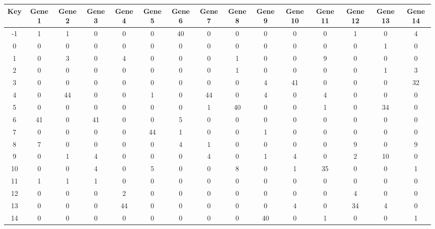 \begin{tabular}{|c|c|c|c|c|c|c|c|c|c|c|c|c|c|c|}
\hline
Key & Gene 1 & Gene 2 & Gene 3 & Gene 4 & Gene 5 & Gene 6 & Gene 7 & Gene 8 & Gene 9 & Gene 10 & Gene 11 & Gene 12 & Gene 13 & Gene 14 \\
\hline
-1 & 1 & 1 & 0 & 0 & 0 & 40 & 0 & 0 & 0 & 0 & 0 & 1 & 0 & 4 \\
0 & 0 & 0 & 0 & 0 & 0 & 0 & 0 & 0 & 0 & 0 & 0 & 0 & 1 & 0 \\
1 & 0 & 3 & 0 & 4 & 0 & 0 & 0 & 1 & 0 & 0 & 9 & 0 & 0 & 0 \\
2 & 0 & 0 & 0 & 0 & 0 & 0 & 0 & 1 & 0 & 0 & 0 & 0 & 1 & 3 \\
3 & 0 & 0 & 0 & 0 & 0 & 0 & 0 & 0 & 4 & 41 & 0 & 0 & 0 & 32 \\
4 & 0 & 44 & 0 & 0 & 1 & 0 & 44 & 0 & 4 & 0 & 4 & 0 & 0 & 0 \\
5 & 0 & 0 & 0 & 0 & 0 & 0 & 1 & 40 & 0 & 0 & 1 & 0 & 34 & 0 \\
6 & 41 & 0 & 41 & 0 & 0 & 5 & 0 & 0 & 0 & 0 & 0 & 0 & 0 & 0 \\
7 & 0 & 0 & 0 & 0 & 44 & 1 & 0 & 0 & 1 & 0 & 0 & 0 & 0 & 0 \\
8 & 7 & 0 & 0 & 0 & 0 & 4 & 1 & 0 & 0 & 0 & 0 & 9 & 0 & 9 \\
9 & 0 & 1 & 4 & 0 & 0 & 0 & 4 & 0 & 1 & 4 & 0 & 2 & 10 & 0 \\
10 & 0 & 0 & 4 & 0 & 5 & 0 & 0 & 8 & 0 & 1 & 35 & 0 & 0 & 1 \\
11 & 1 & 1 & 1 & 0 & 0 & 0 & 0 & 0 & 0 & 0 & 0 & 0 & 0 & 0 \\
12 & 0 & 0 & 0 & 2 & 0 & 0 & 0 & 0 & 0 & 0 & 0 & 4 & 0 & 0 \\
13 & 0 & 0 & 0 & 44 & 0 & 0 & 0 & 0 & 0 & 4 & 0 & 34 & 4 & 0 \\
14 & 0 & 0 & 0 & 0 & 0 & 0 & 0 & 0 & 40 & 0 & 1 & 0 & 0 & 1 \\
\hline
\end{tabular}